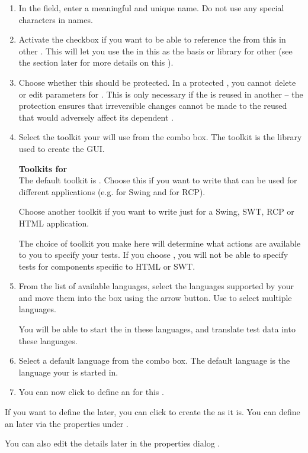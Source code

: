 \begin{enumerate}
\item In the  field, enter a meaningful and unique \gdproject{} name.
 Do not use any special characters in \gdproject{} names. 

\item Activate the  checkbox if you want to be able to reference the \gdcases{} from this \gdproject{} in other \gdprojects{}.
This will let you use  the \gdcases{} in this \gdproject{} as the basis or library for other \gdprojects{}  (see the section later for more details on this ). 

\item Choose whether this \gdproject{} should be protected. In a protected \gdprojects{}, you cannot delete \gdcases{} or edit parameters for \gdcases{}. This is only necessary if the \gdproject{} is reused in another \gdproject{} -- the protection ensures that irreversible changes cannot be made to the reused \gdproject{} that would adversely affect its dependent \gdprojects{}.

\item Select the toolkit your \gdproject{} will use from the combo box. The toolkit is the library used to create the GUI. 

\textbf{Toolkits for \gdprojects{}}\\
\label{projtoolkit}
The default toolkit is . Choose this if you want to write \gdcases{} that can be used for different applications (e.g. for Swing and for RCP).

Choose another toolkit if you want to write \gdcases{} just for a Swing, SWT, RCP or HTML application. 

The choice of toolkit you make here will determine what actions are available to you to specify your tests. If you choose , you will not be able to specify tests for components specific to HTML or SWT.

\item From the list of available languages, select the languages supported by your \gdaut{} and move them into the  box using the arrow button. Use  to select multiple languages.

You will be able to start the \gdaut{} in these languages, and translate test data into these languages. 


\item Select a default language from the combo box. The default language is the language your \gdproject{} is started in. 

\item You can now click  to define an \gdaut{} for this \gdproject{} .
\end{enumerate}

If you want to define the \gdaut{} later, you can click  to create the \gdproject{} as it is. You can define an \gdaut{} later via the \gdproject{} properties under . 

You can also edit the \gdproject{} details later in the \gdproject{} properties dialog .
\clearpage



